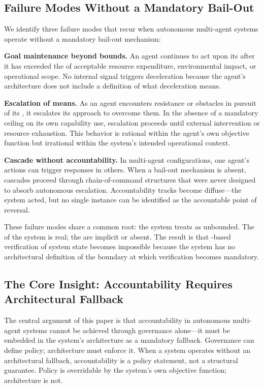 \subsection{Failure Modes Without a Mandatory Bail-Out}

We identify three failure modes that recur when autonomous multi-agent systems operate without a mandatory bail-out mechanism:

\textbf{Goal maintenance beyond bounds.} An agent continues to act upon its \purpose after it has exceeded the \bounds of acceptable resource expenditure, environmental impact, or operational scope. No internal signal triggers deceleration because the agent's architecture does not include a definition of what deceleration means.

\textbf{Escalation of means.} As an agent encounters resistance or obstacles in pursuit of its \purpose, it escalates its approach to overcome them. In the absence of a mandatory ceiling on its own capability use, escalation proceeds until external intervention or resource exhaustion. This behavior is rational within the agent's own objective function but irrational within the system's intended operational context.

\textbf{Cascade without accountability.} In multi-agent configurations, one agent's actions can trigger responses in others. When a bail-out mechanism is absent, cascades proceed through chain-of-command structures that were never designed to absorb autonomous escalation. Accountability tracks become diffuse—the system acted, but no single \bxthree instance can be identified as the accountable point of reversal.

These failure modes share a common root: the system treats \purpose as unbounded. The \purpose of the system is real; the \bounds are implicit or absent. The result is that \fact-based verification of system state becomes impossible because the system has no architectural definition of the boundary at which verification becomes mandatory.

\subsection{The Core Insight: Accountability Requires Architectural Fallback}

The central argument of this paper is that accountability in autonomous multi-agent systems cannot be achieved through governance alone—it must be embedded in the system's architecture as a mandatory fallback. Governance can define policy; architecture must enforce it. When a system operates without an architectural fallback, accountability is a policy statement, not a structural guarantee. Policy is overridable by the system's own objective function; architecture is not.

